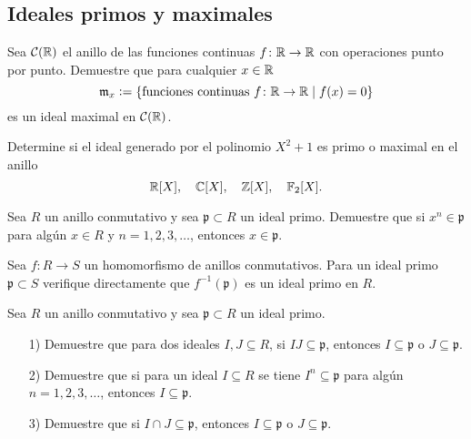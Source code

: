 \subsection*{Ideales primos y maximales}

\begin{ejercicio}
  Sea $\mathcal{C} (\mathbb{R})$ el anillo de las funciones continuas
  $f\colon \mathbb{R}\to \mathbb{R}$ con operaciones punto por punto. Demuestre que para
  cualquier $x\in \mathbb{R}$
  \[ \mathfrak{m}_x \mathrel{\mathop:}=
     \{ \text{funciones continuas } f\colon \mathbb{R}\to \mathbb{R} \mid f (x) = 0 \} \]
  es un ideal maximal en $\mathcal{C} (\mathbb{R})$.
\end{ejercicio}

\begin{ejercicio}
  Determine si el ideal generado por el polinomio $X^2 + 1$ es primo o maximal
  en el anillo
  $$\mathbb{R} [X], \quad \mathbb{C} [X], \quad \mathbb{Z} [X], \quad \mathbb{F}_2 [X].$$
\end{ejercicio}

\begin{ejercicio}
  Sea $R$ un anillo conmutativo y sea $\mathfrak{p} \subset R$ un ideal
  primo. Demuestre que si $x^n \in \mathfrak{p}$ para algún $x\in R$
  y $n = 1,2,3,\ldots$, entonces $x\in \mathfrak{p}$.
\end{ejercicio}

\begin{ejercicio}
  Sea $f\colon R\to S$ un homomorfismo de anillos conmutativos. Para un ideal
  primo $\mathfrak{p}\subset S$ verifique directamente que
  $f^{-1} (\mathfrak{p})$ es un ideal primo en $R$.
\end{ejercicio}

\begin{ejercicio}
  Sea $R$ un anillo conmutativo y sea $\mathfrak{p} \subset R$ un ideal primo.

  \begin{enumerate}
  \item[1)] Demuestre que para dos ideales $I, J \subseteq R$,
    si $IJ \subseteq \mathfrak{p}$, entonces $I \subseteq \mathfrak{p}$ o
    $J \subseteq \mathfrak{p}$.

  \item[2)] Demuestre que si para un ideal $I \subseteq R$ se tiene
    $I^n \subseteq \mathfrak{p}$ para algún $n = 1,2,3,\ldots$, entonces
    $I \subseteq \mathfrak{p}$.

  \item[3)] Demuestre que si $I \cap J \subseteq \mathfrak{p}$, entonces
    $I \subseteq \mathfrak{p}$ o $J \subseteq \mathfrak{p}$.
  \end{enumerate}
\end{ejercicio}


